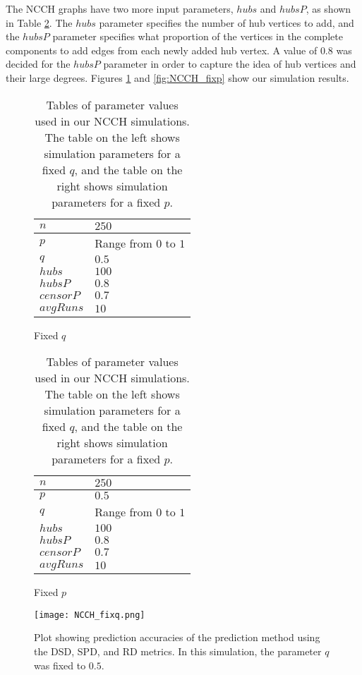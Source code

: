 The NCCH graphs have two more input parameters, $hubs$ and $hubsP$, as
shown in Table \ref{table:NCCH-params}. The $hubs$ parameter specifies the
number of hub vertices to add, and the $hubsP$ parameter specifies what
proportion of the vertices in the complete components to add edges from each newly added hub vertex. A value of $0.8$ was decided for the $hubsP$ 
parameter in order to capture the idea of hub vertices and their large 
degrees. Figures \ref{fig:NCCH_fixq} and \ref{fig:NCCH_fixp} show our 
simulation results.

\begin{table}[h!]
\centering
\begin{subfigure}[h]{0.4\linewidth}
\begin{tabular}{|l|l|}
\hline
$n$ & $250$ \\ \hline
$p$ & Range from $0$ to $1$\\ \hline
$q$ & $0.5$\\ \hline
$hubs$ & $100$\\ \hline
$hubsP$ & $0.8$\\ \hline
$censorP$ & $0.7$\\ \hline
$avgRuns$ & $10$\\ \hline
\end{tabular}
\caption{Fixed $q$}
\end{subfigure}
\hfill
\begin{subfigure}[h]{0.4\linewidth}
\begin{tabular}{|l|l|}
\hline
$n$ & $250$ \\ \hline
$p$ & $0.5$\\ \hline
$q$ & Range from $0$ to $1$\\ \hline
$hubs$ & $100$\\ \hline
$hubsP$ & $0.8$\\ \hline
$censorP$ & $0.7$\\ \hline
$avgRuns$ & $10$\\ \hline
\end{tabular}
\caption{Fixed $p$}
\end{subfigure}%
\caption{Tables of parameter values used in our NCCH simulations. The table
on the left shows simulation parameters for a fixed $q$, and the table on
the right shows simulation parameters for a fixed $p$.}
\label{table:NCCH-params}
\end{table}

\begin{figure}[h!]
\centering
\texttt{[image: NCCH\_fixq.png]}
\caption{Plot showing prediction accuracies of the prediction method using the DSD, SPD, and RD metrics. In this simulation, the parameter $q$ was fixed to $0.5$.}
\label{fig:NCCH_fixq}
\end{figure}

